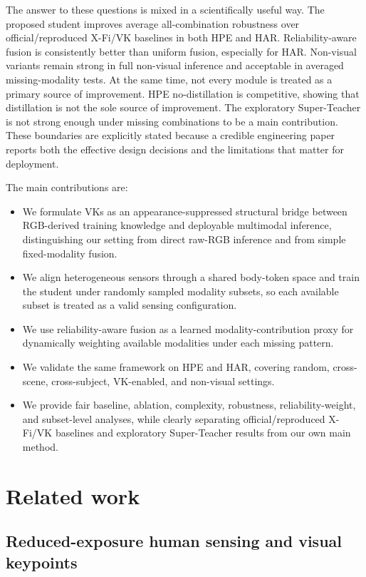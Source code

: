 \documentclass[preprint,12pt]{elsarticle}
\begin{document}
The answer to these questions is mixed in a scientifically useful way. The proposed student improves average all-combination robustness over official/reproduced X-Fi/VK baselines in both HPE and HAR. Reliability-aware fusion is consistently better than uniform fusion, especially for HAR. Non-visual variants remain strong in full non-visual inference and acceptable in averaged missing-modality tests. At the same time, not every module is treated as a primary source of improvement. HPE no-distillation is competitive, showing that distillation is not the sole source of improvement. The exploratory Super-Teacher is not strong enough under missing combinations to be a main contribution. These boundaries are explicitly stated because a credible engineering paper reports both the effective design decisions and the limitations that matter for deployment.

The main contributions are:

\begin{itemize}
    \item We formulate VKs as an appearance-suppressed structural bridge between RGB-derived training knowledge and deployable multimodal inference, distinguishing our setting from direct raw-RGB inference and from simple fixed-modality fusion.
    \item We align heterogeneous sensors through a shared body-token space and train the student under randomly sampled modality subsets, so each available subset is treated as a valid sensing configuration.
    \item We use reliability-aware fusion as a learned modality-contribution proxy for dynamically weighting available modalities under each missing pattern.
    \item We validate the same framework on HPE and HAR, covering random, cross-scene, cross-subject, VK-enabled, and non-visual settings.
    \item We provide fair baseline, ablation, complexity, robustness, reliability-weight, and subset-level analyses, while clearly separating official/reproduced X-Fi/VK baselines and exploratory Super-Teacher results from our own main method.
\end{itemize}

\section{Related work}

\subsection{Reduced-exposure human sensing and visual keypoints}
\end{document}
